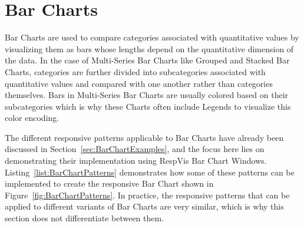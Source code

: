 \section{Bar Charts}
\label{sec:BarChartsUsage}

Bar Charts are used to compare categories associated with quantitative
values by visualizing them as bars whose lengths depend on the
quantitative dimension of the data.  In the case of Multi-Series Bar
Charts like Grouped and Stacked Bar Charts, categories are further
divided into subcategories associated with quantitative values and
compared with one another rather than categories themselves.  Bars in
Multi-Series Bar Charts are usually colored based on their
subcategories which is why these Charts often include Legends to
visualize this color encoding.

The different responsive patterns applicable to Bar Charts have
already been discussed in Section~\ref{sec:BarChartExamples}, and the
focus here lies on demonstrating their implementation using RespVis
Bar Chart Windows.  Listing~\ref{list:BarChartPatterns} demonstrates
how some of these patterns can be implemented to create the responsive
Bar Chart shown in Figure~\ref{fig:BarChartPatterns}.  In practice,
the responsive patterns that can be applied to different variants of
Bar Charts are very similar, which is why this section does not
differentiate between them.

